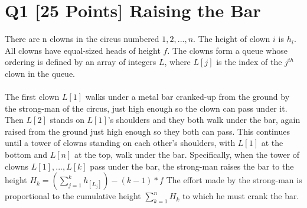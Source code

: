 \documentclass[10pt]{article}
\begin{document}
\section*{Q1 [25 Points] Raising the Bar}
There are n clowns in the circus numbered $1, 2, . . . , n$. The height of clown $i$ is $h_i$. All clowns have equal-sized heads of height $f$. The clowns form a queue whose ordering is defined by an array of integers $L$, where $L[j]$ is the index of the $j^{th}$ clown in the queue.
\\
\\
The first clown $L[1]$ walks under a metal bar cranked-up from the ground by the strong-man of the circus, just high enough so the clown can pass under it. Then $L[2]$ stands on $L[1]$’s shoulders and they both walk under the bar, again raised from the ground just high enough so they both can pass. This continues until a tower of clowns standing on each other’s shoulders, with $L[1]$ at the bottom and $L[n]$ at the top, walk under the bar. Specifically, when the tower of clowns $L[1], . . . , L[k]$ pass under the bar, the strong-man raises the bar to the height $H_k = (\sum_{j=1}^{k} h_{[L_j]}) - (k - 1) * f$ The effort made by the strong-man is proportional to the cumulative height $\sum_{k=1}^{n}H_k$ to which he must
crank the bar.
\end{document}
